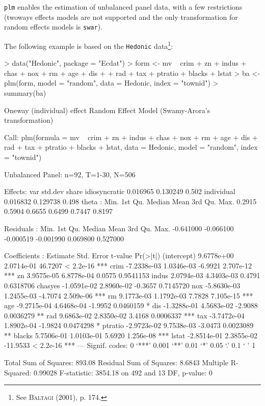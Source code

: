 \documentclass[a4paper]{article}
\begin{document}
\texttt{plm} enables the estimation of unbalanced panel data, with a
few restrictions (twoways effects models are not supported and the
only transformation for random effects models is \texttt{swar}).

The
following example is based on the \texttt{Hedonic} data\footnote{See \textsc{Baltagi}
  (2001), p. 174.}:

\begin{Schunk}
\begin{Sinput}
> data("Hedonic", package = "Ecdat")
> form <- mv ~ crim + zn + indus + chas + nox + rm + age + dis + 
+     rad + tax + ptratio + blacks + lstat
> ba <- plm(form, model = "random", data = Hedonic, index = "townid")
> summary(ba)
\end{Sinput}
\begin{Soutput}
Oneway (individual) effect Random Effect Model (Swamy-Arora's transformation)

Call:
plm(formula = mv ~ crim + zn + indus + chas + nox + rm + age + 
    dis + rad + tax + ptratio + blacks + lstat, data = Hedonic, 
    model = "random", index = "townid")

Unbalanced Panel: n=92, T=1-30, N=506

Effects:
                   var  std.dev share
idiosyncratic 0.016965 0.130249 0.502
individual    0.016832 0.129738 0.498
theta  : 
   Min. 1st Qu.  Median    Mean 3rd Qu.    Max. 
 0.2915  0.5904  0.6655  0.6499  0.7447  0.8197 

Residuals :
     Min.   1st Qu.    Median      Mean   3rd Qu.      Max. 
-0.641000 -0.066100 -0.000519 -0.001990  0.069800  0.527000 

Coefficients :
               Estimate  Std. Error  t-value  Pr(>|t|)    
(intercept)  9.6778e+00  2.0714e-01  46.7207 < 2.2e-16 ***
crim        -7.2338e-03  1.0346e-03  -6.9921 2.707e-12 ***
zn           3.9575e-05  6.8778e-04   0.0575 0.9541153    
indus        2.0794e-03  4.3403e-03   0.4791 0.6318706    
chasyes     -1.0591e-02  2.8960e-02  -0.3657 0.7145720    
nox         -5.8630e-03  1.2455e-03  -4.7074 2.509e-06 ***
rm           9.1773e-03  1.1792e-03   7.7828 7.105e-15 ***
age         -9.2715e-04  4.6468e-04  -1.9952 0.0460159 *  
dis         -1.3288e-01  4.5683e-02  -2.9088 0.0036279 ** 
rad          9.6863e-02  2.8350e-02   3.4168 0.0006337 ***
tax         -3.7472e-04  1.8902e-04  -1.9824 0.0474298 *  
ptratio     -2.9723e-02  9.7538e-03  -3.0473 0.0023089 ** 
blacks       5.7506e-01  1.0103e-01   5.6920 1.256e-08 ***
lstat       -2.8514e-01  2.3855e-02 -11.9533 < 2.2e-16 ***
---
Signif. codes:  0 ‘***’ 0.001 ‘**’ 0.01 ‘*’ 0.05 ‘.’ 0.1 ‘ ’ 1 

Total Sum of Squares: 893.08
Residual Sum of Squares: 8.6843
Multiple R-Squared: 0.99028
F-statistic: 3854.18 on 492 and 13 DF, p-value: 0
\end{Soutput}
\end{Schunk}
\end{document}
